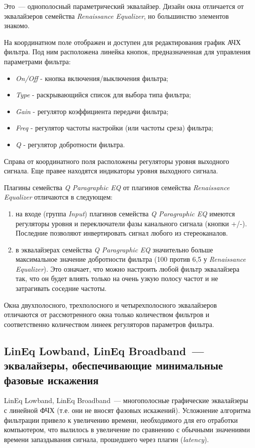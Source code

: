 \documentclass[oneside, final, 14pt]{extreport}
\begin{document}
Это~--- однополосный параметрический эквалайзер. Дизайн окна отличается от эквалайзеров семейства \emph{Renaissance Equalizer}, но большинство элементов знакомо.

На координатном поле отображен и доступен для редактирования график АЧХ фильтра. Под ним расположена линейка кнопок, предназначенная для управления параметрами фильтра:
\begin{itemize}
  \item \emph{On/Off} - кнопка включения/выключения фильтра;
  \item \emph{Type} - раскрывающийся список для выбора типа фильтра;
  \item \emph{Gain} - регулятор коэффициента передачи фильтра;
  \item \emph{Freq} - регулятор частоты настройки (или частоты среза) фильтра;
  \item \emph{Q} - регулятор добротности фильтра.
\end{itemize}

Справа от координатного поля расположены регуляторы уровня выходного сигнала. Еще правее находятся индикаторы уровня выходного сигнала.

Плагины семейства \emph{Q Paragraphic EQ} от плагинов семейства \emph{Renaissance Equalizer} отличаются в следующем:
\begin{enumerate}
  \item на входе (группа \emph{Input}) плагинов семейства \emph{Q Paragraphic EQ} имеются регуляторы уровня и переключатели фазы канального сигнала (кнопки +/-). Последние позволяют инвертировать сигнал любого из стереоканалов.
  \item в эквалайзерах семейства \emph{Q Paragraphic EQ} значительно больше максимальное значение добротности фильтра (100 против 6,5 у \emph{Renaissance Equalizer}). Это означает, что можно настроить любой фильтр эквалайзера так, что он будет влиять только на очень узкую полосу частот и не затрагивать соседние частоты.
\end{enumerate}

Окна двухполосного, трехполосного и четырехполосного эквалайзеров отличаются от рассмотренного окна только количеством фильтров и соответственно количеством линеек регуляторов параметров фильтра.

\subsection{LinEq Lowband, LinEq Broadband~--- эквалайзеры, обеспечивающие минимальные фазовые искажения}
LinEq Lowband, LinEq Broadband~--- многополосные графические эквалайзеры с линейной ФЧХ (т.е. они не вносят фазовых искажений). Усложнение алгоритма фильтрации привело к увеличению времени, необходимого для его отработки компьютером, что вылилось в увеличение по сравнению с обычными значениями времени запаздывания сигнала, прошедшего через плагин (\emph{latency}). 
\end{document}
